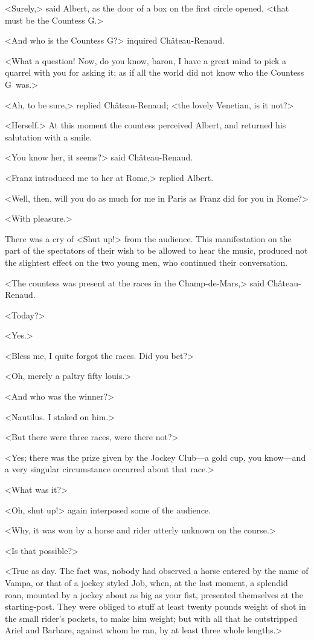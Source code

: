  <Surely,> said Albert, as the door of a box on the first circle opened, <that must be the Countess G\doubleemdash.> 

 <And who is the Countess G\doubleemdash?> inquired Château-Renaud. 

 <What a question! Now, do you know, baron, I have a great mind to pick a quarrel with you for asking it; as if all the world did not know who the Countess G\doubleemdash~was.> 

 <Ah, to be sure,> replied Château-Renaud; <the lovely Venetian, is it not?> 

 <Herself.> At this moment the countess perceived Albert, and returned his salutation with a smile. 

 <You know her, it seems?> said Château-Renaud. 

 <Franz introduced me to her at Rome,> replied Albert. 

 <Well, then, will you do as much for me in Paris as Franz did for you in Rome?> 

 <With pleasure.> 

 There was a cry of <Shut up!> from the audience. This manifestation on the part of the spectators of their wish to be allowed to hear the music, produced not the slightest effect on the two young men, who continued their conversation. 

 <The countess was present at the races in the Champ-de-Mars,> said Château-Renaud. 

 <Today?> 

 <Yes.> 

 <Bless me, I quite forgot the races. Did you bet?> 

 <Oh, merely a paltry fifty louis.> 

 <And who was the winner?> 

 <Nautilus. I staked on him.> 

 <But there were three races, were there not?> 

 <Yes; there was the prize given by the Jockey Club—a gold cup, you know—and a very singular circumstance occurred about that race.> 

 <What was it?> 

 <Oh, shut up!> again interposed some of the audience. 

 <Why, it was won by a horse and rider utterly unknown on the course.> 

 <Is that possible?> 

 <True as day. The fact was, nobody had observed a horse entered by the name of Vampa, or that of a jockey styled Job, when, at the last moment, a splendid roan, mounted by a jockey about as big as your fist, presented themselves at the starting-post. They were obliged to stuff at least twenty pounds weight of shot in the small rider's pockets, to make him weight; but with all that he outstripped Ariel and Barbare, against whom he ran, by at least three whole lengths.> 

